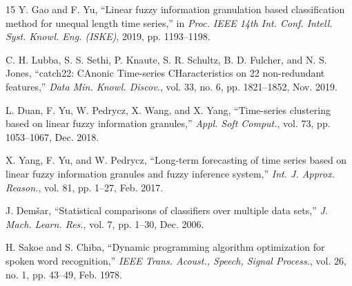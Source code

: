 \documentclass[conference]{IEEEtran}
\begin{document}
\begin{thebibliography}{15}
Y. Gao and F. Yu, ``Linear fuzzy information granulation based classification method for unequal length time series,'' in \textit{Proc. IEEE 14th Int. Conf. Intell. Syst. Knowl. Eng. (ISKE)}, 2019, pp. 1193--1198.

C. H. Lubba, S. S. Sethi, P. Knaute, S. R. Schultz, B. D. Fulcher, and N. S. Jones, ``catch22: CAnonic Time-series CHaracteristics on 22 non-redundant features,'' \textit{Data Min. Knowl. Discov.}, vol. 33, no. 6, pp. 1821--1852, Nov. 2019.

L. Duan, F. Yu, W. Pedrycz, X. Wang, and X. Yang, ``Time-series clustering based on linear fuzzy information granules,'' \textit{Appl. Soft Comput.}, vol. 73, pp. 1053--1067, Dec. 2018.

X. Yang, F. Yu, and W. Pedrycz, ``Long-term forecasting of time series based on linear fuzzy information granules and fuzzy inference system,'' \textit{Int. J. Approx. Reason.}, vol. 81, pp. 1--27, Feb. 2017.

J. Dem\v{s}ar, ``Statistical comparisons of classifiers over multiple data sets,'' \textit{J. Mach. Learn. Res.}, vol. 7, pp. 1--30, Dec. 2006.

H. Sakoe and S. Chiba, ``Dynamic programming algorithm optimization for spoken word recognition,'' \textit{IEEE Trans. Acoust., Speech, Signal Process.}, vol. 26, no. 1, pp. 43--49, Feb. 1978.

\end{thebibliography}
\end{document}
